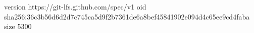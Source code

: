 version https://git-lfs.github.com/spec/v1
oid sha256:36c3b56d6d2d7c745ca5d9f2b7361de6a8bef45841902e094d4c65ee9cd4faba
size 5300
